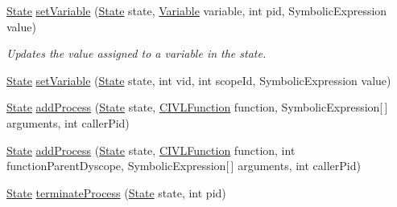 \begin{DoxyCompactItemize}
\hyperlink{interfaceedu_1_1udel_1_1cis_1_1vsl_1_1civl_1_1state_1_1IF_1_1State}{State} \hyperlink{interfaceedu_1_1udel_1_1cis_1_1vsl_1_1civl_1_1state_1_1IF_1_1StateFactory_ae266fa51d2dea90e7e5d3ca8b45dd22b}{set\+Variable} (\hyperlink{interfaceedu_1_1udel_1_1cis_1_1vsl_1_1civl_1_1state_1_1IF_1_1State}{State} state, \hyperlink{interfaceedu_1_1udel_1_1cis_1_1vsl_1_1civl_1_1model_1_1IF_1_1variable_1_1Variable}{Variable} variable, int pid, Symbolic\+Expression value)
\begin{DoxyCompactList}\small\item\em Updates the value assigned to a variable in the state. \end{DoxyCompactList}\item 
\hyperlink{interfaceedu_1_1udel_1_1cis_1_1vsl_1_1civl_1_1state_1_1IF_1_1State}{State} \hyperlink{interfaceedu_1_1udel_1_1cis_1_1vsl_1_1civl_1_1state_1_1IF_1_1StateFactory_ab1877edd7985bfa3bb4171fed7671472}{set\+Variable} (\hyperlink{interfaceedu_1_1udel_1_1cis_1_1vsl_1_1civl_1_1state_1_1IF_1_1State}{State} state, int vid, int scope\+Id, Symbolic\+Expression value)
\item 
\hyperlink{interfaceedu_1_1udel_1_1cis_1_1vsl_1_1civl_1_1state_1_1IF_1_1State}{State} \hyperlink{interfaceedu_1_1udel_1_1cis_1_1vsl_1_1civl_1_1state_1_1IF_1_1StateFactory_a2c05d9800df5a48cfd13da18caf24364}{add\+Process} (\hyperlink{interfaceedu_1_1udel_1_1cis_1_1vsl_1_1civl_1_1state_1_1IF_1_1State}{State} state, \hyperlink{interfaceedu_1_1udel_1_1cis_1_1vsl_1_1civl_1_1model_1_1IF_1_1CIVLFunction}{C\+I\+V\+L\+Function} function, Symbolic\+Expression\mbox{[}$\,$\mbox{]} arguments, int caller\+Pid)
\item 
\hyperlink{interfaceedu_1_1udel_1_1cis_1_1vsl_1_1civl_1_1state_1_1IF_1_1State}{State} \hyperlink{interfaceedu_1_1udel_1_1cis_1_1vsl_1_1civl_1_1state_1_1IF_1_1StateFactory_af2a497fca3857a16cda6ddda36d2eb49}{add\+Process} (\hyperlink{interfaceedu_1_1udel_1_1cis_1_1vsl_1_1civl_1_1state_1_1IF_1_1State}{State} state, \hyperlink{interfaceedu_1_1udel_1_1cis_1_1vsl_1_1civl_1_1model_1_1IF_1_1CIVLFunction}{C\+I\+V\+L\+Function} function, int function\+Parent\+Dyscope, Symbolic\+Expression\mbox{[}$\,$\mbox{]} arguments, int caller\+Pid)
\item 
\hyperlink{interfaceedu_1_1udel_1_1cis_1_1vsl_1_1civl_1_1state_1_1IF_1_1State}{State} \hyperlink{interfaceedu_1_1udel_1_1cis_1_1vsl_1_1civl_1_1state_1_1IF_1_1StateFactory_aefff2ccf75944f8eea5c77d95aeb3b5f}{terminate\+Process} (\hyperlink{interfaceedu_1_1udel_1_1cis_1_1vsl_1_1civl_1_1state_1_1IF_1_1State}{State} state, int pid)

\end{DoxyCompactItemize}
